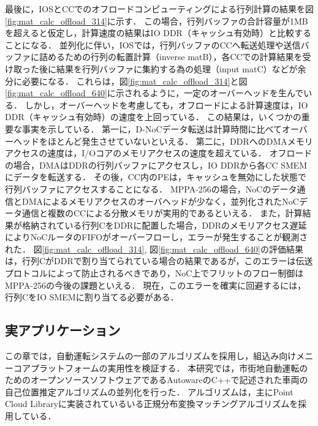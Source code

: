 \documentclass[submit,techrep]{ipsj_v2/UTF8/ipsj}
\begin{document}
最後に，IOSとCCでのオフロードコンピューティングによる行列計算の結果を図\ref{fig:mat_calc_offload_314}に示す．
この場合，行列バッファの合計容量が1MBを超えると仮定し，計算速度の結果はIO DDR（キャッシュ有効時）と比較することになる．
並列化に伴い，IOSでは，行列バッファのCCへ転送処理や送信バッファに詰めるための行列の転置計算（inverse matB），各CCでの計算結果を受け取った後に結果を行列バッファに集約する為の処理（input matC）などが余分に必要になる．
これらは，図\ref{fig:mat_calc_offload_314}と図\ref{fig:mat_calc_offload_640}に示されるように，一定のオーバーヘッドを生んでいる．
しかし，オーバーヘッドを考慮しても，オフロードによる計算速度は，IO DDR（キャッシュ有効時）の速度を上回っている．
この結果は，いくつかの重要な事実を示している．
第一に，D-NoCデータ転送は計算時間に比べてオーバーヘッドをほとんど発生させていないといえる．
第二に，DDRへのDMAメモリアクセスの速度は，I/Oコアのメモリアクセスの速度を超えている．
オフロードの場合，DMAはDDRの行列バッファにアクセスし，IO DDRから各CC SMEMにデータを転送する．
その後，CC内のPEは，キャッシュを無効にした状態で行列バッファにアクセスすることになる．
MPPA-256の場合，NoCのデータ通信とDMAによるメモリアクセスのオーバヘッドが少なく，並列化されたNoCデータ通信と複数のCCによる分散メモリが実用的であるといえる．
また，計算結果が格納されている行列CをDDRに配置した場合，DDRのメモリアクセス遅延によりNoCルータのFIFOがオーバーフローし，エラーが発生することが観測された．
図\ref{fig:mat_calc_offload_314}, 図\ref{fig:mat_calc_offload_640}の評価結果は，行列CがDDRで割り当てられている場合の結果であるが，このエラーは伝送プロトコルによって防止されるべきであり，NoC上でフリットのフロー制御はMPPA-256の今後の課題といえる．
現在，このエラーを確実に回避するには，行列CをIO SMEMに割り当てる必要がある．

\subsection{実アプリケーション}
\label{sec:practical_application}
この章では，自動運転システムの一部のアルゴリズムを採用し，組込み向けメニーコアプラットフォームの実用性を検証する．
本研究では，市街地自動運転のためのオープンソースソフトウェアであるAutoware\cite{kato2015open}のC++で記述された車両の自己位置推定アルゴリズムの並列化を行った．
アルゴリズムは，主にPoint Cloud Library\cite{pcl}に実装されているいる正規分布変換マッチングアルゴリズム\cite{magnusson2009three}を採用している．
\end{document}

